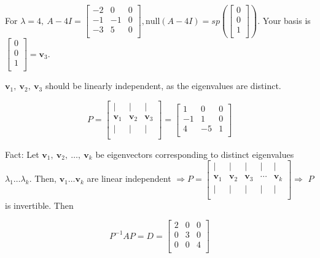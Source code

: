 \documentclass[12pt]{article}
\theoremstyle{plain}
\theoremstyle{remark}
\theoremstyle{definition}
\begin{document}
For \(\lambda = 4,\ A - 4I = \begin{bmatrix}
 - 2 & 0 & 0 \\
 - 1 & - 1 & 0 \\
 - 3 & 5 & 0 \\
\end{bmatrix},\text{null}(A - 4I) = sp\left( \begin{bmatrix}
0 \\
0 \\
1 \\
\end{bmatrix} \right)\). Your basis is \(\begin{bmatrix}
0 \\
0 \\
1 \\
\end{bmatrix} = {\mathbf{v}}_{3}\).

\({\mathbf{v}}_{1},\ {\mathbf{v}}_{2},\ {\mathbf{v}}_{3}\)
should be linearly independent, as the eigenvalues are distinct.

\[P = \begin{bmatrix}
 \mid & \mid & \mid \\
{\mathbf{v}}_{1} & {\mathbf{v}}_{2} & {\mathbf{v}}_{3} \\
 \mid & \mid & \mid \\
\end{bmatrix} = \begin{bmatrix}
1 & 0 & 0 \\
 - 1 & 1 & 0 \\
4 & - 5 & 1 \\
\end{bmatrix}\]

Fact: Let
\({\mathbf{v}}_{1},\ {\mathbf{v}}_{2},\ \ldots,\ {\mathbf{v}}_{k}\)
be eigenvectors corresponding to distinct eigenvalues
\(\lambda_{1}\ldots\lambda_{k}\). Then,
\({\mathbf{v}}_{1}\ldots{\mathbf{v}}_{k}\) are linear
independent \(\Rightarrow P = \begin{bmatrix}
 \mid & \mid & \mid & \mid & \mid \\
{\mathbf{v}}_{1} & {\mathbf{v}}_{2} & {\mathbf{v}}_{3} & \cdots & {\mathbf{v}}_{k} \\
 \mid & \mid & \mid & \mid & \mid \\
\end{bmatrix} \Rightarrow\) \(P\) is invertible. Then

\[P^{- 1}AP = D = \begin{bmatrix}
2 & 0 & 0 \\
0 & 3 & 0 \\
0 & 0 & 4 \\
\end{bmatrix}\]
\end{document}
